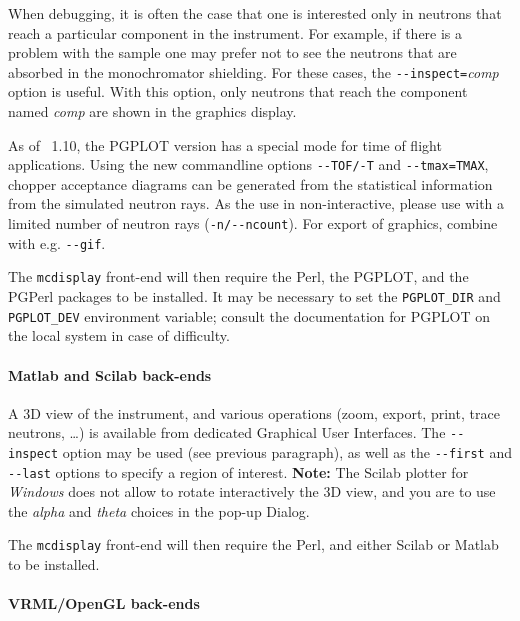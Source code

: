 When debugging, it is often the case that one is interested only in
neutrons that reach a particular component in the instrument. For
example, if there is a problem with the sample one may prefer not to see
the neutrons that are absorbed in the monochromator shielding. For these
cases, the \verb+--inspect=+\textit{comp\/} option is useful. With this
option, only neutrons that reach the component named \textit{comp\/} are
shown in the graphics display.

As of \MCS\ 1.10, the PGPLOT version has a special mode for time of
flight applications. Using the new commandline options \verb+--TOF/-T+
and \verb+--tmax=TMAX+, chopper acceptance diagrams can be generated
from the statistical information from the simulated neutron rays. As
the use in non-interactive, please use with a limited number of
neutron rays (\verb+-n/--ncount+). For export of graphics, combine
with e.g. \verb+--gif+.

The \verb+mcdisplay+ front-end will then require the Perl, the PGPLOT, and the
PGPerl packages to be installed. It may be necessary to set the
\verb+PGPLOT_DIR+ and \verb+PGPLOT_DEV+ environment variable; consult the
documentation for PGPLOT on the local system in case of difficulty.
  

\paragraph{Matlab and Scilab back-ends}

A 3D view of the instrument, and various operations (zoom, export, print, trace neutrons, \ldots) is available from dedicated Graphical User Interfaces.
The \verb+--inspect+ option may be used (see previous paragraph), as well as the \verb+--first+ and \verb+--last+ options to specify a region of interest. {\bf Note:} The Scilab plotter for \emph{Windows} does not allow to rotate interactively the 3D view, and you are to use the \emph{alpha} and \emph{theta} choices in the pop-up Dialog.

The \verb+mcdisplay+ front-end will then
require the Perl, and either Scilab or Matlab to be installed.  

\paragraph{VRML/OpenGL back-ends}

